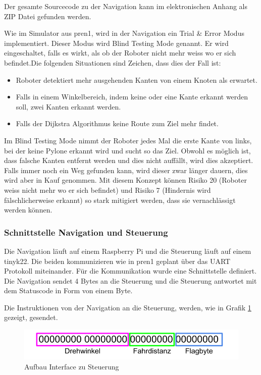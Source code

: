 Der gesamte Sourcecode zu der Navigation kann im elektronischen Anhang als ZIP Datei gefunden werden.

Wie im Simulator aus \acrshort{pren1}, wird in der Navigation ein Trial \& Error Modus implementiert. Dieser Modus wird Blind Testing Mode genannt. Er wird eingeschaltet, falls es wirkt, als ob der Roboter nicht mehr weiss wo er sich befindet.Die folgenden Situationen sind Zeichen, dass dies der Fall ist:

\begin{itemize}
    \item Roboter detektiert mehr ausgehenden Kanten von einem Knoten als erwartet.
    \item Falls in einem Winkelbereich, indem keine oder eine Kante erkannt werden soll, zwei Kanten erkannt werden.
    \item Falls der Dijkstra Algorithmus keine Route zum Ziel mehr findet.
\end{itemize}

Im Blind Testing Mode nimmt der Roboter jedes Mal die erste Kante von links, bei der keine Pylone erkannt wird und sucht so das Ziel. Obwohl es möglich ist, dass falsche Kanten entfernt werden und dies nicht auffällt, wird dies akzeptiert. Falls immer noch ein Weg gefunden kann, wird dieser zwar länger dauern, dies wird aber in Kauf genommen. Mit diesem Konzept können Risiko 20 (Roboter weiss nicht mehr wo er sich befindet) und Risiko 7 (Hindernis wird fälschlicherweise erkannt) so stark mitigiert werden, dass sie vernachlässigt werden können.

\subsubsection{Schnittstelle Navigation und Steuerung}
\label{interface-nav-control}

Die Navigation läuft auf einem Raspberry Pi und die Steuerung läuft auf einem \gls{tinyk22}. Die beiden kommunizieren wie in \acrshort{pren1} geplant über das UART Protokoll miteinander. Für die Kommunikation wurde eine Schnittstelle definiert. Die Navigation sendet 4 Bytes an die Steuerung und die Steuerung antwortet mit dem Statuscode in Form von einem Byte.

Die Instruktionen von der Navigation an die Steuerung, werden, wie in Grafik \ref{fig:interface-tiny} gezeigt, gesendet.

\begin{figure}[H]
\centering
\includegraphics[width=\textwidth]{assets/IT/interface-tiny.png}
\caption{Aufbau Interface zu Steuerung}
\label{fig:interface-tiny}
\end{figure}

